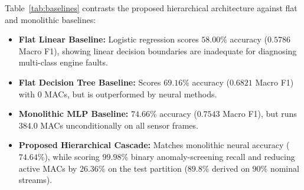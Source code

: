\documentclass[journal]{IEEEtran}
\begin{document}
\begin{table}[t]
\centering
\footnotesize
\caption{Architectural Comparison: Flat Baselines vs. Hierarchical Multi-Fidelity Cascade [HELD-OUT TEST PARTITION]}
\label{tab:baselines}
\end{table}

Table~\ref{tab:baselines} contrasts the proposed hierarchical architecture against flat and monolithic baselines:
\begin{itemize}
    \item \textbf{Flat Linear Baseline:} Logistic regression scores $58.00\%$ accuracy ($0.5786$ Macro F1), showing linear decision boundaries are inadequate for diagnosing multi-class engine faults.
    \item \textbf{Flat Decision Tree Baseline:} Scores $69.16\%$ accuracy ($0.6821$ Macro F1) with $0$ MACs, but is outperformed by neural methods.
    \item \textbf{Monolithic MLP Baseline:} $74.66\%$ accuracy ($0.7543$ Macro F1), but runs $384.0$ MACs unconditionally on all sensor frames.
    \item \textbf{Proposed Hierarchical Cascade:} Matches monolithic neural accuracy ($74.64\%$), while scoring $99.98\%$ binary anomaly-screening recall and reducing active MACs by $26.36\%$ on the test partition ($89.8\%$ derived on $90\%$ nominal streams).
\end{itemize}
\end{document}
